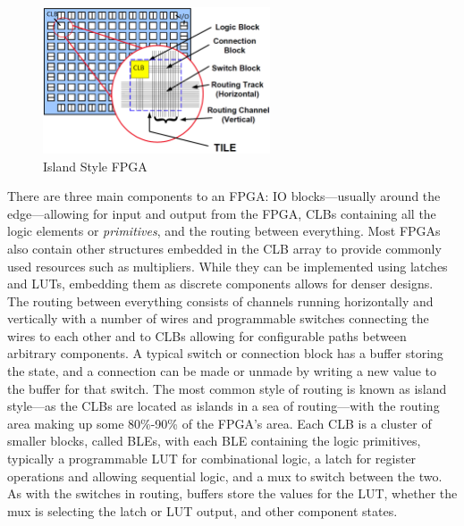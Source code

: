 \documentclass[12pt,final,oneside]{memoir} %
\begin{document}
\begin{figure}
    \begin{center}
        \includegraphics[width=0.6\textwidth]{images/fpga-arch.png}
        \caption{Island Style FPGA\cite{WiltonLecture}}
        \label{FPGAArch}
    \end{center}
\end{figure}

There are three main components to an \ac{FPGA}: \ac{IO} blocks---usually around the edge---allowing for input and output from the \ac{FPGA}, \acp{CLB} containing all the logic elements or \emph{primitives}, and the routing between everything.
Most \acp{FPGA} also contain other structures embedded in the \ac{CLB} array to provide commonly used resources such as multipliers. While they can be implemented using latches and \acp{LUT}, embedding them as discrete components allows for denser designs.
The routing between everything consists of channels running horizontally and vertically with a number of wires and programmable switches connecting the wires to each other and to \acp{CLB} allowing for configurable paths between arbitrary components. A typical switch or connection block has a buffer storing the state, and a connection can be made or unmade by writing a new value to the buffer for that switch. The most common style of routing is known as island style---as the \acp{CLB} are located as islands in a sea of routing---with the routing area making up some 80\%-90\% of the \ac{FPGA}'s area\cite{FPGAArch}.
Each \ac{CLB} is a cluster of smaller blocks, called \acp{BLE}, with each \ac{BLE} containing the logic primitives, typically a programmable \ac{LUT} for combinational logic, a latch for register operations and allowing sequential logic, and a \ac{mux} to switch between the two. As with the switches in routing, buffers store the values for the \ac{LUT}, whether the \ac{mux} is selecting the latch or \ac{LUT} output, and other component states.
\end{document}
